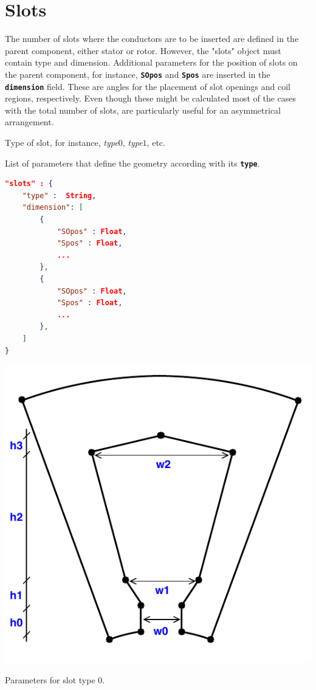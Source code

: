 \documentclass[justified]{tufte-book} %
\begin{document}
\chapter{Slots}
\label{ch:slots}
\begin{fullwidth}
The number of slots where the conductors are to be inserted are defined in the parent component, either stator or rotor. However, the "slots" object must contain type and dimension. Additional parameters for the position of slots on the parent component, for instance, \texttt{\textbf{SOpos}} and \texttt{\textbf{Spos}} are inserted in the \texttt{\textbf{dimension}} field. These are angles for the placement of slot openings and coil regions, respectively. Even though these might be calculated most of the cases with the total number of slots, are particularly useful for an asymmetrical arrangement. 
\end{fullwidth}
\begin{description}[leftmargin=4cm, style=nextline]
\item[\normalfont{\ttfamily{\textbf{type}}: \textit{String}}] Type of slot, for instance, \textit{type$0$}, \textit{type$1$}, etc.
\item[\normalfont{\ttfamily{\textbf{dimension}}: \textit{Array}}] List of parameters that define the geometry according with its \texttt{\textbf{type}}.
\end{description}

\begin{lstlisting}[language=json]
"slots" : {
	"type" :  String,
	"dimension": [
		{
			"SOpos" : Float,
			"Spos" : Float,
			...
		},
		{
			"SOpos" : Float,
			"Spos" : Float,
			...
		},
	]
}
\end{lstlisting}

\begin{marginfigure}
\includegraphics[width=\linewidth]{Slot_Type_0_parameters.pdf}
\caption{Parameters for slot type $0$.}
\label{fig:slot_type_0_parameters}
\end{marginfigure}
\end{document}
